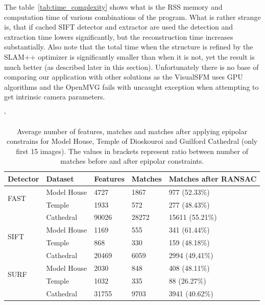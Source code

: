 The table~\ref{tab:time_complexity} shows what is the RSS memory and computation time of various combinations of the program. What is rather strange is, that if cached SIFT detector and extractor are used the detection and extraction time lowers significantly, but the reconstruction time increases substantially. Also note that the total time when the structure is refined by the SLAM++ optimizer is significantly smaller than when it is not, yet the result is much better (as described later in this section). Unfortunately there is no base of comparing our application with other solutions as the VisualSFM uses GPU algorithms and the OpenMVG fails with uncaught exception when attempting to get intrinsic camera parameters.
%
\begin{table}[!htbp]
	\catcode`
	\begin{center}
		\begin{tabular}{| l | l | l | l | l |}
			\hline
			\textbf{Detector} & 
			\textbf{Dataset} & 
			\textbf{Features} & 
			\textbf{Matches}  &
			\textbf{Matches after RANSAC}  \\ \hline 
			\multirow{2}{*}{FAST}	& Model House		& 4727		& 1867		& 977 (52.33\%) \\ \cline{2-5}
												& Temple				& 1933		& 572		& 277 (48.43\%) \\ \cline{2-5}
												& Cathedral			& 90026	& 28272	& 15611 (55.21\%)\\ \hline
			\multirow{2}{*}{SIFT}	& Model House		& 1169		& 555		& 341 (61.44\%) \\ \cline{2-5}
												& Temple				& 868		& 330		& 159 (48.18\%) \\ \cline{2-5}
												& Cathedral			& 20469	& 6059		&	2994 (49,41\%) \\ \hline
			\multirow{2}{*}{SURF}	& Model House		&2030		& 848		& 408 (48.11\%) \\ \cline{2-5}
												& Temple				& 1032		& 335		& 88 (26.27\%) \\ \cline{2-5}
												& Cathedral			& 31755	& 9703		& 3941 (40.62\%)\\ \hline
		\end{tabular}
		\caption{Average number of features, matches and matches after applying epipolar constrains for Model House, Temple of Dioskouroi and Guilford Cathedral (only first 15 images). The values in brackets represent ratio between number of matches before and after epipolar constraints.}
		\label{tab:keypoints_matches}
	\end{center}
\end{table}

